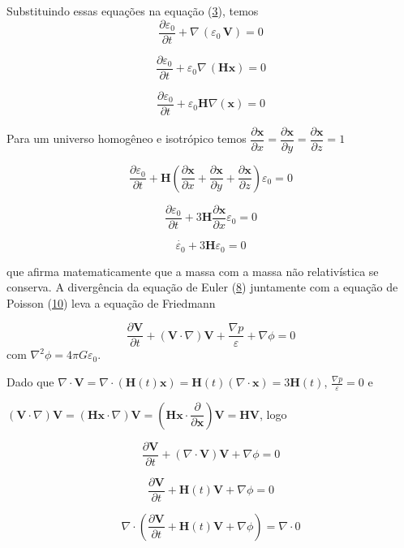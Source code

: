 \documentclass[a4paper,12pt]{article}
\begin{document}
Substituindo essas equações na equação (\hyperref[eq3]{3}), temos
$$\dfrac{\partial \varepsilon_0}{\partial t} +\nabla \,(\varepsilon_0 \, \textbf{V}) = 0$$

$$\dfrac{\partial \varepsilon_0}{\partial t} +\varepsilon_0\nabla \,( \mathbf{H} \mathbf{x}) = 0$$

$$\dfrac{\partial \varepsilon_0}{\partial t} +\varepsilon_0\mathbf{H}\nabla(\mathbf{x}) = 0$$

Para um universo homogêneo e isotrópico temos $\dfrac{\partial\mathbf{x}}{\partial x}=\dfrac{\partial\mathbf{x}}{\partial y} =\dfrac{\partial\mathbf{x}}{\partial z} = 1$

$$\dfrac{\partial \varepsilon_0}{\partial t} +\mathbf{H}\left(\dfrac{\partial\mathbf{x}}{\partial x}+\dfrac{\partial\mathbf{x}}{\partial y} +\dfrac{\partial\mathbf{x}}{\partial z} \right)\varepsilon_0 = 0$$

$$\dfrac{\partial \varepsilon_0}{\partial t} +3\mathbf{H} \dfrac{\partial\mathbf{x}}{\partial x}\varepsilon_0= 0$$

\begin{equation}\label{eq33}
	\dot{\varepsilon_0} + 3 \mathbf{H}\varepsilon_0 = 0 
\end{equation}

que afirma matematicamente que a massa com a massa não relativística se conserva. A divergência da equação de Euler (\hyperref[eq8]{8}) juntamente com a equação de Poisson (\hyperref[eq10]{10}) leva a equação de Friedmann 

 $$\dfrac{\partial \textbf{V} }{\partial t} + (\textbf{V} \cdot \nabla ) \textbf{V} + \frac{\nabla p}{\varepsilon} + \nabla \phi =0$$ com $\nabla^2\phi = 4\pi G\varepsilon_0$.

Dado que $\nabla\cdot\mathbf{V} = \nabla \cdot (\mathbf{H}(t)\mathbf{x}) = \mathbf{H}(t) (\nabla\cdot\mathbf{x}) = 3\mathbf{H}(t)$, $\frac{\nabla p}{\varepsilon} = 0$ e

 $(\mathbf{V}\cdot\nabla)\mathbf{V} = (\mathbf{H}\mathbf{x}\cdot\nabla)\mathbf{V}=(\mathbf{H}\mathbf{x}\cdot\dfrac{\partial }{\partial \mathbf{x}})\mathbf{V}= \mathbf{H}\mathbf{V}$, logo


$$\dfrac{\partial \textbf{V} }{\partial t} + ( \nabla\cdot\textbf{V} ) \textbf{V}   + \nabla \phi =0$$

$$\dfrac{\partial \textbf{V} }{\partial t} +\mathbf{H}(t)\mathbf{V}  + \nabla \phi =0$$

 $$\nabla\cdot \left(\dfrac{\partial \textbf{V} }{\partial t} +\mathbf{H}(t)\mathbf{V}  + \nabla \phi \right) =\nabla\cdot0$$
 
\end{document}
